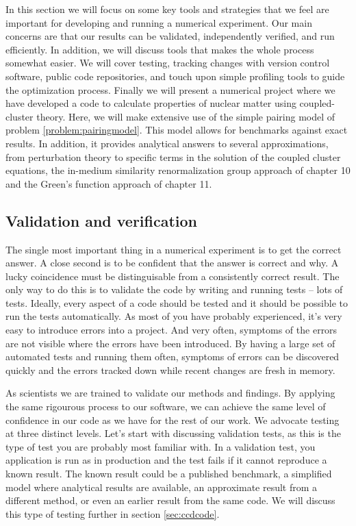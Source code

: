 In this section we will focus on some key tools and strategies that we feel are
important for developing and running a numerical experiment. Our main concerns
are that our results can be validated, independently verified, and run
efficiently. In addition, we will discuss tools that makes the whole process somewhat easier. We will
cover testing, tracking changes with version control software, public code
repositories, and touch upon simple profiling tools to guide the optimization
process. Finally we will present a numerical project where we have developed a
code to calculate properties of nuclear matter using coupled-cluster
theory. Here, we will make extensive use of the simple pairing model of problem
\ref{problem:pairingmodel}. This model allows for benchmarks against exact
results. In addition, it provides analytical answers to several approximations,
from perturbation theory to specific terms in the solution of the coupled
cluster equations, the in-medium similarity renormalization group approach of
chapter 10 and the Green's function approach of chapter 11.

\subsection{Validation and verification}
The single most important thing in a numerical experiment is to get the correct
answer. A close second is to be confident that the answer is correct and why. A
lucky coincidence must be distinguisable from a consistently correct result. The
only way to do this is to validate the code by writing and running tests -- lots
of tests. Ideally, every aspect of a code should be tested and it should be
possible to run the tests automatically. As most of you have probably
experienced, it's very easy to introduce errors into a project. And very often,
symptoms of the errors are not visible where the errors have been introduced. By
having a large set of automated tests and running them often, symptoms of errors
can be discovered quickly and the errors tracked down while recent changes are
fresh in memory.

As scientists we are trained to validate our methods and findings. By applying
the same rigourous process to our software, we can achieve the same level of
confidence in our code as we have for the rest of our work. We advocate testing
at three distinct levels. Let's start with discussing validation tests, as this
is the type of test you are probably most familiar with. In a validation test,
you application is run as in production and the test fails if it cannot
reproduce a known result. The known result could be a published benchmark, a
simplified model where analytical results are available, an approximate result
from a different method, or even an earlier result from the same code. We will
discuss this type of testing further in section \ref{sec:ccdcode}.

